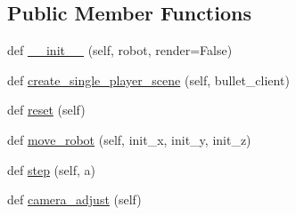 \subsection*{Public Member Functions}
\begin{DoxyCompactItemize}
\item 
def \hyperlink{classpybullet-gym_1_1pybulletgym_1_1envs_1_1roboschool_1_1envs_1_1locomotion_1_1walker__base__env_1_1_walker_base_bullet_env_a7fd2a335c616f0e8537e39618e912abd}{\+\_\+\+\_\+init\+\_\+\+\_\+} (self, robot, render=False)
\item 
def \hyperlink{classpybullet-gym_1_1pybulletgym_1_1envs_1_1roboschool_1_1envs_1_1locomotion_1_1walker__base__env_1_1_walker_base_bullet_env_a80fb739fae4111f188de9c54238e460e}{create\+\_\+single\+\_\+player\+\_\+scene} (self, bullet\+\_\+client)
\item 
def \hyperlink{classpybullet-gym_1_1pybulletgym_1_1envs_1_1roboschool_1_1envs_1_1locomotion_1_1walker__base__env_1_1_walker_base_bullet_env_a747b397a0bcf2c837284e0cb18c5ed8a}{reset} (self)
\item 
def \hyperlink{classpybullet-gym_1_1pybulletgym_1_1envs_1_1roboschool_1_1envs_1_1locomotion_1_1walker__base__env_1_1_walker_base_bullet_env_a8e5ff155c0d3c7e79197ddf4dd3e0d20}{move\+\_\+robot} (self, init\+\_\+x, init\+\_\+y, init\+\_\+z)
\item 
def \hyperlink{classpybullet-gym_1_1pybulletgym_1_1envs_1_1roboschool_1_1envs_1_1locomotion_1_1walker__base__env_1_1_walker_base_bullet_env_afcdd5b3ae7bde22a34cebb09fe44b7a2}{step} (self, a)
\item 
def \hyperlink{classpybullet-gym_1_1pybulletgym_1_1envs_1_1roboschool_1_1envs_1_1locomotion_1_1walker__base__env_1_1_walker_base_bullet_env_a53a284c64c17f944c69c44a189c60ab7}{camera\+\_\+adjust} (self)
\end{DoxyCompactItemize}
